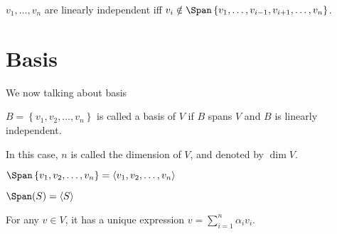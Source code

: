 \begin{lemma}
    \(v_1, \dots , v_n\) are linearly independent iff \(v_i \notin \Span \left\{ v_1, \dots , v_{i-1}, v_{i+1}, \dots , v_n \right\} \).  
\end{lemma}

\section{Basis}

\begin{definition*}
    We now talking about basis
    \begin{definition}[Basis] \label{def: basis}
        \(B = \left\{ v_1, v_2, \dots , v_n \right\} \) is called a basis of \(V\) if \(B\) spans \(V\) and \(B\) is linearly independent.     
    \end{definition}
    \begin{definition}[Dimension] \label{def: Dimeansion}
        In this case, \(n\) is called the dimension of \(V\), and denoted by \(\dim V\).   
    \end{definition}

    \begin{notation}
        \(\Span \left\{ v_1, v_2, \dots , v_n \right\} = \langle v_1, v_2, \dots , v_n \rangle  \) 
    \end{notation}

    \begin{notation}
        \(\Span(S) = \langle S \rangle \) 
    \end{notation}
\end{definition*}

\begin{theorem} \label{thm: unique coordinate}
    For any \(v \in V\), it has a unique expression \(v = \sum_{i=1}^n \alpha _i v_i \).  
\end{theorem}